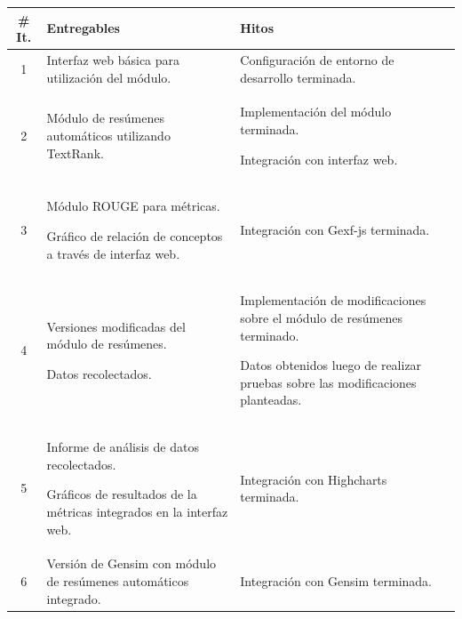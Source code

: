 \documentclass[12pt,a4paper]{article}
\newcommand{\tabitem}{\par\hspace*{\labelsep}\textbullet\hspace*{\labelsep}}
\begin{document}
\begin{center}
\begin{tabular}{ | c | p{5.8cm} | p{5.8cm} |}
    \hline
        \textbf{\# It.} & 
        
        \textbf{Entregables} & 
        
        \textbf{Hitos} \\
    \hline
        1 &
        
        \tabitem Interfaz web básica para utilización del módulo. &
        
        \tabitem Configuración de entorno de desarrollo terminada. \\
    \hline   
        2 & 
        
        \tabitem Módulo de resúmenes automáticos utilizando \mbox{TextRank}. & 
        
        \tabitem Implementación del módulo terminada.
        \tabitem Integración con interfaz web. \\
    \hline   
        3 & 
        
        \tabitem Módulo ROUGE para métricas.
        \tabitem Gráfico de relación de conceptos a través de interfaz web. &
        
        \tabitem Integración con Gexf-js terminada. \\
    \hline   
        4 & 
        
        \tabitem Versiones modificadas del módulo de resúmenes.
        \tabitem Datos recolectados. & 
        
        \tabitem Implementación de modificaciones sobre el módulo de resúmenes terminado.
        \tabitem Datos obtenidos luego de realizar pruebas sobre las modificaciones planteadas. \\
    \hline   
        5 & 
        
        \tabitem Informe de análisis de datos recolectados.
        \tabitem Gráficos de resultados de la métricas integrados en la interfaz web. & 
        
        \tabitem Integración con Highcharts terminada. \\
    \hline  
        6 & 
        
        \tabitem Versión de Gensim con módulo de resúmenes automáticos integrado. & 
        
        \tabitem Integración con Gensim terminada. \\
    \hline
\end{tabular}
\end{center}
\end{document}
